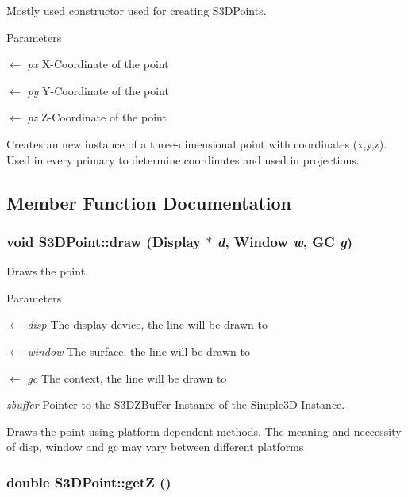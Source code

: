 Mostly used constructor used for creating S3DPoints. 


\begin{DoxyParams}{Parameters}
\item[\mbox{$\leftarrow$} {\em px}]X-\/Coordinate of the point \item[\mbox{$\leftarrow$} {\em py}]Y-\/Coordinate of the point \item[\mbox{$\leftarrow$} {\em pz}]Z-\/Coordinate of the point\end{DoxyParams}
Creates an new instance of a three-\/dimensional point with coordinates (x,y,z). Used in every primary to determine coordinates and used in projections. 

\subsection{Member Function Documentation}
\hypertarget{class_s3_d_point_a59aee595c8ae9bfbb60915a09c06b0aa}{
\subsubsection[{draw}]{\setlength{\rightskip}{0pt plus 5cm}void S3DPoint::draw (Display $\ast$ {\em d}, \/  Window {\em w}, \/  GC {\em g})}}
\label{class_s3_d_point_a59aee595c8ae9bfbb60915a09c06b0aa}


Draws the point. 


\begin{DoxyParams}{Parameters}
\item[\mbox{$\leftarrow$} {\em disp}]The display device, the line will be drawn to \item[\mbox{$\leftarrow$} {\em window}]The surface, the line will be drawn to \item[\mbox{$\leftarrow$} {\em gc}]The context, the line will be drawn to \item[{\em zbuffer}]Pointer to the S3DZBuffer-\/Instance of the Simple3D-\/Instance.\end{DoxyParams}
Draws the point using platform-\/dependent methods. The meaning and neccessity of disp, window and gc may vary between different platforms \hypertarget{class_s3_d_point_a255a77e4ca340344be1b1bd6b6a3f418}{
\subsubsection[{getZ}]{\setlength{\rightskip}{0pt plus 5cm}double S3DPoint::getZ ()}}
\label{class_s3_d_point_a255a77e4ca340344be1b1bd6b6a3f418}


